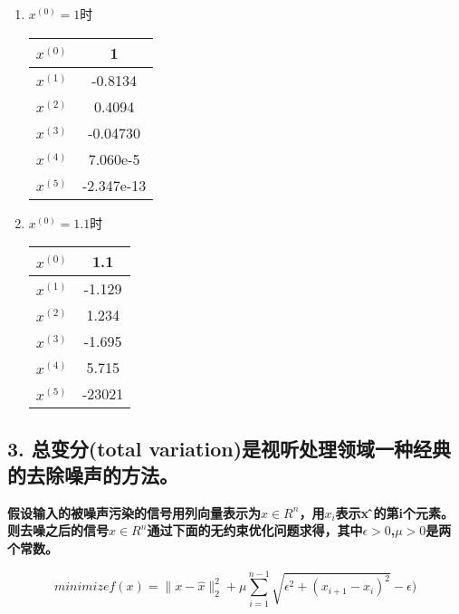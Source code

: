 \documentclass[]{article}
\begin{document}
\begin{enumerate}
    \item $x^{(0)}=1$时
    
    \begin{center}
    \begin{tabular}{|c|c|}
    \hline
        $x^{(0)}$ & 1 \\
        \hline
        $x^{(1)}$ & -0.8134 \\
        \hline
        $x^{(2)}$ & 0.4094 \\
        \hline
        $x^{(3)}$ & -0.04730 \\
        \hline
        $x^{(4)}$ & 7.060e-5\\
        \hline
        $x^{(5)}$ & -2.347e-13 \\
    \hline
    \end{tabular}
    \end{center}
    
    \item $x^{(0)}=1.1$时
    
    \begin{center}
    \begin{tabular}{|c|c|}
    \hline
        $x^{(0)}$ & 1.1 \\
        \hline
        $x^{(1)}$ & -1.129 \\
        \hline
        $x^{(2)}$ & 1.234 \\
        \hline
        $x^{(3)}$ & -1.695 \\
        \hline
        $x^{(4)}$ & 5.715\\
        \hline
        $x^{(5)}$ & -23021 \\
    \hline
    \end{tabular}
    \end{center}
    
\end{enumerate}

\hypertarget{header-n94}{%
\subsection{3. 总变分(total variation)是视听处理领域一种经典的去除噪声的方法。}\label{header-n94}}

\textbf{假设输入的被噪声污染的信号用列向量表示为$x\in R^n$，用$x_i$表示x ̂的第i个元素。则去噪之后的信号$x\in R^n$通过下面的无约束优化问题求得，其中$\epsilon>0$,$\mu>0$是两个常数。}

$$
minimize f(x)=\lVert x - \hat{x} \rVert_2^2 +\mu \sum_{i=1}^{n-1} \sqrt{\epsilon^2+(x_{i+1}-x_i)^2}-\epsilon)
$$
\end{document}
